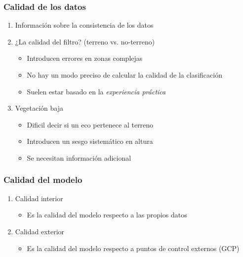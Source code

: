 \begin{frame}
  \frametitle{Calidad de los datos}
  \begin{enumerate}
    \item<1-> Información sobre la consistencia de los datos
    \item<2-> ¿La calidad del filtro? (terreno vs. no-terreno)
      \begin{itemize}
        \item Introducen errores en zonas complejas
        \item No hay un modo preciso de calcular la calidad de la clasificación
        \item Suelen estar basado en la \emph{\alert{experiencia práctica}}
      \end{itemize}
    \item<3-> Vegetación baja
      \begin{itemize}
        \item Dificil decir si un eco pertenece al terreno
        \item Introducen un \alert{sesgo sistemático} en altura
        \item Se necesitan información adicional
      \end{itemize}
  \end{enumerate}
\end{frame}
\begin{frame}
  \frametitle{Calidad del modelo}
  \begin{enumerate}
    \item<1-> Calidad \alert<1>{interior}
      \begin{itemize}
        \item Es la calidad del modelo respecto a las \alert<1>{propios datos}
      \end{itemize}
    \item<2-> Calidad \alert<2>{exterior}
      \begin{itemize}
        \item Es la calidad del modelo respecto a \alert<1>{puntos de control
          externos (GCP)}
      \end{itemize}
  \end{enumerate}
\end{frame}
